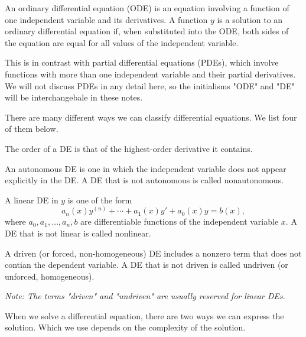 \documentclass[../m82main.tex]{subfiles}
\begin{document}
\begin{definition}
    An ordinary differential equation (ODE) is an equation involving a function of one independent variable and its derivatives.
    A function $y$ is a solution to an ordinary differential equation if, when substituted into the ODE, both sides of the equation are equal for all values of the independent variable.
\end{definition}

This is in contrast with partial differential equations (PDEs), which involve functions with more than one independent variable and their partial derivatives.
We will not discuss PDEs in any detail here, so the initialisms "ODE" and "DE" will be interchangebale in these notes.

There are many different ways we can classify differential equations.
We list four of them below.

\begin{definition}
    The order of a DE is that of the highest-order derivative it contains.
\end{definition}

\begin{definition}
    An autonomous DE is one in which the independent variable does not appear explicitly in the DE.
    A DE that is not autonomous is called nonautonomous.
\end{definition}

\begin{definition}
    A linear DE in $y$ is one of the form
    \[ a_n(x)y^{(n)} + \cdots + a_1(x)y' + a_0(x)y = b(x), \]
    where $a_0, a_1, \ldots, a_n, b$ are differentiable functions of the independent variable $x$.
    A DE that is not linear is called nonlinear.
\end{definition}

\begin{definition}
    A driven (or forced, non-homogeneous) DE includes a nonzero term that does not contian the dependent variable.
    A DE that is not driven is called undriven (or unforced, homogeneous).

    \medskip
    \textit{Note: The terms "driven" and "undriven" are usually reserved for linear DEs.}
\end{definition}

When we solve a differential equation, there are two ways we can express the solution.
Which we use depends on the complexity of the solution.
\end{document}
